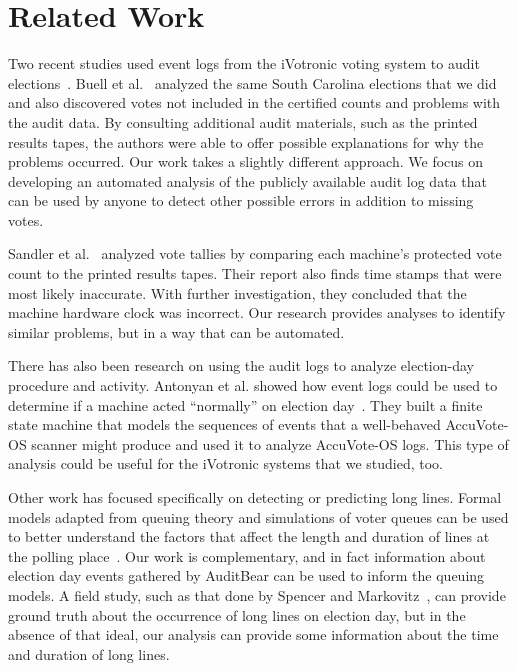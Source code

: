 \documentclass[letterpaper,twocolumn,10pt]{article}
\begin{document}
 \section{Related Work}
Two recent studies used event logs from the iVotronic voting system to audit
elections~\cite{Buell2011, Sandler2007}. Buell et al.~\cite{Buell2011} analyzed
the same South Carolina elections that we did and also discovered votes not
included in the certified counts and problems with the audit data. By consulting
additional audit materials, such as the printed results tapes, the authors were
able to offer possible explanations for why the problems occurred. Our work
takes a slightly different approach. We focus on developing an automated
analysis of the publicly available audit log data that can be used by
anyone to detect other possible errors in addition to missing votes.   

Sandler et al.~\cite{Sandler2007} analyzed vote tallies by comparing each
machine's protected vote count to the printed results tapes. Their report also
finds time stamps that were most likely inaccurate. With further investigation,
they concluded that the machine hardware clock was incorrect. Our research
provides analyses to identify similar problems, but in a way that can be
automated.   

There has also been research on using the audit logs to analyze election-day
procedure and activity. Antonyan et al. showed how event logs could be used to
determine if a machine acted ``normally'' on election
day~\cite{Antonyan2009}. They built a finite state machine that models the
sequences of events that a well-behaved AccuVote-OS scanner might produce and
used it to analyze AccuVote-OS logs. This type of analysis could be useful for
the iVotronic systems that we studied, too.  

Other work has focused specifically on detecting or predicting long
lines. Formal models adapted from queuing theory and simulations of voter queues
can be used to better understand the factors that affect the length and duration
of lines at the polling place~\cite{Allen2006, Edel2010}. Our work is
complementary, and in fact information about election day events gathered by
AuditBear can be used to inform the queuing models. A field study, such as that
done by Spencer and Markovitz~\cite{Spencer2010}, can provide ground truth about
the occurrence of long lines on election day, but in the absence of that ideal,
our analysis can provide some information about the time and duration of long
lines. 
\end{document}
